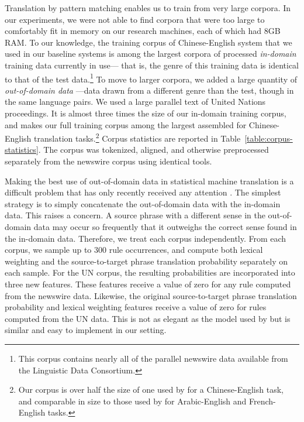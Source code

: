Translation by pattern matching enables us to train from very 
large corpora.  In our experiments, we were not able to find
corpora that were too large to comfortably fit in memory on our
research machines, each of which had 8GB RAM.
To our knowledge, the training corpus of Chinese-English system
that we used in our baseline systems is among the largest corpora
of processed {\em in-domain} training data currently in use---
that is, the genre of this training data is identical to that
of the test data.\footnote{This corpus contains nearly all of the parallel 
newswire data available from the Linguistic Data Consortium.}  To move
to larger corpora, we added a large quantity of {\em out-of-domain data}
---data drawn from a different genre than the test, though in 
the same language pairs.  We used a large parallel text of 
United Nations proceedings.  It is almost three times
the size of our in-domain training corpus, and makes our full 
training corpus among the largest assembled for Chinese-English 
translation tasks.\footnote{Our corpus is over half the size of
one used by \citet{Zens:2007:hlt-naacl} for a Chinese-English
task, and comparable in size
to those used by \citet{Fraser:2006:acl-coling} for Arabic-English
and French-English tasks.} Corpus statistics
are reported in Table~\ref{table:corpus-statistics}.  The corpus
was tokenized, aligned, and otherwise preprocessed separately from
the newswire corpus using identical tools.

Making the best use of out-of-domain data in statistical 
machine translation is a difficult problem that has only 
recently received any attention \citep{foster:2007:smt}.
The simplest strategy is to simply concatenate the out-of-domain
data with the in-domain data.  This
raises a concern.  A source phrase with a different
sense in the out-of-domain data may occur so frequently
that it outweighs the correct sense found in the 
in-domain data.  Therefore, we treat each corpus independently.  
From each corpus, we sample up to 300 rule
occurrences, and compute both lexical weighting and the
source-to-target phrase translation probability separately
on each sample.  For the UN corpus, the resulting probabilities
are incorporated into three new features.  These features
receive a value of zero for any rule computed from the newswire
data.  Likewise, the original source-to-target phrase
translation probability and lexical weighting features receive a value
of zero for rules computed from the UN data.  This is not 
as elegant as the model used by \citet{foster:2007:smt} 
but is similar and easy to implement in our setting.

